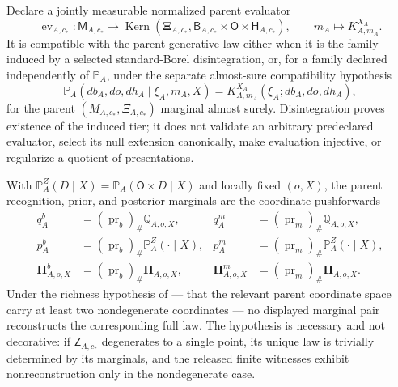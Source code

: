 Declare a jointly measurable normalized parent evaluator
\begin{equation}
\operatorname{ev}_{A,c_*}:\mathsf M_{A,c_*}\longrightarrow
\operatorname{Kern}(\boldsymbol\Xi_{A,c_*},
\mathsf B_{A,c_*}\times\mathsf O\times\mathsf H_{A,c_*}),
\qquad m_A\longmapsto K^{X_A}_{A,m_A}.
\label{eq:rg-pointwise-parent-evaluator}
\end{equation}
It is compatible with the parent generative law either when it is the family induced by a selected
standard-Borel disintegration, or, for a family declared independently of $\mathbb P_A$, under the
separate almost-sure compatibility hypothesis
\begin{equation}
\mathbb P_A(db_A,do,dh_A\mid\xi_A,m_A,X)
=K^{X_A}_{A,m_A}(\xi_A;db_A,do,dh_A),
\label{eq:rg-pointwise-parent-evaluator-compatibility}
\end{equation}
for the parent $(M_{A,c_*},\Xi_{A,c_*})$ marginal almost surely. Disintegration proves existence of the induced
tier; it does not validate an arbitrary predeclared evaluator, select its null extension canonically,
make evaluation injective, or regularize a quotient of presentations.

With $\mathbb P_A^Z(D\mid X)=\mathbb P_A(\mathsf O\times D\mid X)$ and locally fixed $(o,X)$,
the parent recognition, prior, and posterior marginals are the coordinate pushforwards
\begin{align}
q_A^b&=(\operatorname{pr}_b)_\#\mathbb Q_{A,o,X},
&q_A^m&=(\operatorname{pr}_m)_\#\mathbb Q_{A,o,X},
\label{eq:rg-pointwise-parent-recognition-marginals}\\
p_A^b&=(\operatorname{pr}_b)_\#\mathbb P_A^Z(\cdot\mid X),
&p_A^m&=(\operatorname{pr}_m)_\#\mathbb P_A^Z(\cdot\mid X),
\label{eq:rg-pointwise-parent-prior-marginals}\\
\boldsymbol\Pi_{A,o,X}^b&=(\operatorname{pr}_b)_\#\boldsymbol\Pi_{A,o,X},
&\boldsymbol\Pi_{A,o,X}^m&=(\operatorname{pr}_m)_\#\boldsymbol\Pi_{A,o,X}.
\label{eq:rg-pointwise-parent-posterior-marginals}
\end{align}
Under the richness hypothesis of  --- that the
relevant parent coordinate space carry at least two nondegenerate coordinates --- no displayed
marginal pair reconstructs the corresponding full law. The hypothesis is necessary and not
decorative: if $\mathsf Z_{A,c_*}$ degenerates to a single point, its unique law is trivially determined by
its marginals, and the released finite witnesses exhibit nonreconstruction only in the nondegenerate
case.

